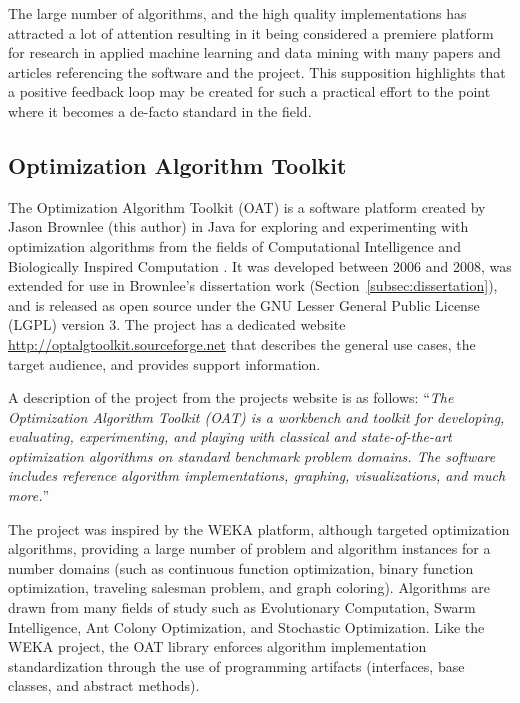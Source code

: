 \documentclass[a4paper, 11pt]{article}
\begin{document}
The large number of algorithms, and the high quality implementations has attracted a lot of attention resulting in it being considered a premiere platform for research in applied machine learning and data mining with many papers and articles referencing the software and the project. This supposition highlights that a positive feedback loop may be created for such a practical effort to the point where it becomes a de-facto standard in the field. 

% 
% 
\subsection{Optimization Algorithm Toolkit}
\label{subsec:oat}
The Optimization Algorithm Toolkit (OAT) is a software platform created by Jason Brownlee (this author) in Java for exploring and experimenting with optimization algorithms from the fields of Computational Intelligence and Biologically Inspired Computation \cite{Brownlee2007}. It was developed between 2006 and 2008, was extended for use in Brownlee's dissertation work (Section~\ref{subsec:dissertation}), and is released as open source under the GNU Lesser General Public License (LGPL) version 3. The project has a dedicated website \url{http://optalgtoolkit.sourceforge.net} that describes the general use cases, the target audience, and provides support information.

A description of the project from the projects website is as follows: ``\emph{The Optimization Algorithm Toolkit (OAT) is a workbench and toolkit for developing, evaluating, experimenting, and playing with classical and state-of-the-art optimization algorithms on standard benchmark problem domains. The software includes reference algorithm implementations, graphing, visualizations, and much more.}''

The project was inspired by the WEKA platform, although targeted optimization algorithms, providing a large number of problem and algorithm instances for a number domains (such as continuous function optimization, binary function optimization, traveling salesman problem, and graph coloring). Algorithms are drawn from many fields of study such as Evolutionary Computation, Swarm Intelligence, Ant Colony Optimization, and Stochastic Optimization. Like the WEKA project, the OAT library enforces algorithm implementation standardization through the use of programming artifacts (interfaces, base classes, and abstract methods).
\end{document}
